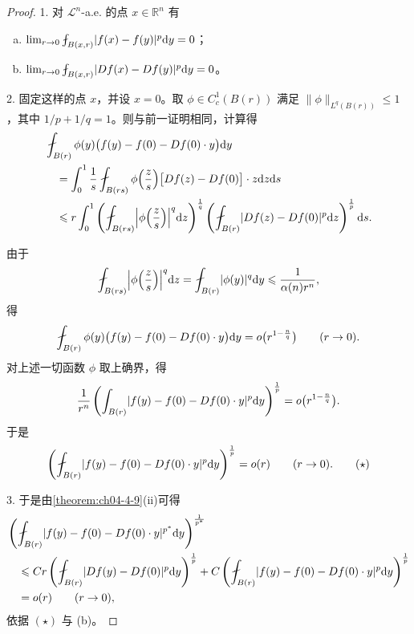 \documentclass[../../main.tex]{subfiles}%
\begin{document}
\begin{proof}
1. 对 $\mathcal{L}^n$-a.e. 的点 $x\in\mathbb{R}^n$ 有
\begin{enumerate}[(a)]
\item $\lim_{r\to0}\fint_{B(x,r)}\lvert f(x)-f(y)\rvert^{p}\diff y=0$；
\item $\lim_{r\to0}\fint_{B(x,r)}\lvert Df(x)-Df(y)\rvert^{p}\diff y=0$。
\end{enumerate}

2. 固定这样的点 $x$，并设 $x=0$。取 $\phi\in C_c^1(B(r))$ 满足 $\lVert\phi\rVert_{L^q(B(r))}\leqslant1$，其中 $1/p+1/q=1$。则与前一证明相同，计算得
\begin{align*}
&\fint_{B(r)}\phi(y)\bigl(f(y)-f(0)-Df(0)\cdot y\bigr)\diff y\\
&\quad=\int_0^1\frac{1}{s}\fint_{B(rs)}\phi\Bigl(\frac{z}{s}\Bigr)\bigl[Df(z)-Df(0)\bigr]\cdot z\diff z\diff s\\
&\quad\leqslant r\int_0^1\left(\fint_{B(rs)}\Bigl\lvert\phi\Bigl(\frac{z}{s}\Bigr)\Bigr\rvert^{q}\diff z\right)^{\frac{1}{q}}\left(\fint_{B(r)}\lvert Df(z)-Df(0)\rvert^{p}\diff z\right)^{\frac{1}{p}}\diff s.
\end{align*}

由于
\begin{align*}
\fint_{B(rs)}\Bigl\lvert\phi\Bigl(\frac{z}{s}\Bigr)\Bigr\rvert^{q}\diff z=\fint_{B(r)}\lvert\phi(y)\rvert^{q}\diff y\leqslant\frac{1}{\alpha(n)r^{n}},
\end{align*}
得
\begin{align*}
\fint_{B(r)}\phi(y)\bigl(f(y)-f(0)-Df(0)\cdot y\bigr)\diff y=o\bigl(r^{1-\frac{n}{q}}\bigr)\qquad(r\to0).
\end{align*}
对上述一切函数 $\phi$ 取上确界，得
\begin{align*}
\frac{1}{r^{n}}\left(\int_{B(r)}\lvert f(y)-f(0)-Df(0)\cdot y\rvert^{p}\mathrm{d} y\right)^{\frac{1}{p}}=o\bigl(r^{1-\frac{n}{q}}\bigr).
\end{align*}
于是
\begin{align*}
\left(\fint_{B(r)}\lvert f(y)-f(0)-Df(0)\cdot y\rvert^{p}\diff y\right)^{\frac{1}{p}}=o(r)\qquad(r\to0).\qquad(\star)
\end{align*}

3. 于是由\cref{theorem:ch04-4-9}(ii)可得%
\begin{align*}
&\left(\fint_{B(r)}\lvert f(y)-f(0)-Df(0)\cdot y\rvert^{p^{*}}\diff y\right)^{\frac{1}{p^{*}}}\\
&\quad\leqslant Cr\left(\fint_{B(r)}\lvert Df(y)-Df(0)\rvert^{p}\diff y\right)^{\frac{1}{p}}+C\left(\fint_{B(r)}\lvert f(y)-f(0)-Df(0)\cdot y\rvert^{p}\diff y\right)^{\frac{1}{p}}\\
&\quad=o(r)\qquad(r\to0),
\end{align*}
依据 $(\star)$ 与 (b)。


\end{proof}
\end{document}
